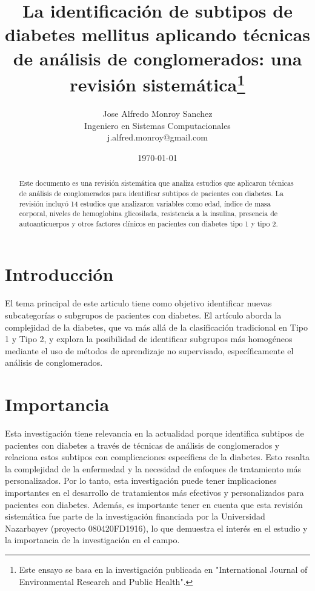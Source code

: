 \documentclass[12pt]{article}
\begin{document}
\title{\textbf{La identificación de subtipos de diabetes mellitus aplicando técnicas de análisis de conglomerados: una revisión sistemática\thanks{Este ensayo se basa en la investigación publicada en "International Journal of Environmental Research and Public Health".}}}
\author{Jose Alfredo Monroy Sanchez\\ Ingeniero en Sistemas Computacionales\\ j.alfred.monroy@gmail.com}
\date{\today}
\maketitle


\begin{abstract}
  Este documento es una revisión sistemática que analiza estudios que aplicaron técnicas de análisis de conglomerados para identificar subtipos de pacientes con diabetes. La revisión incluyó 14 estudios que analizaron variables como edad, índice de masa corporal, niveles de hemoglobina glicosilada, resistencia a la insulina, presencia de autoanticuerpos y otros factores clínicos en pacientes con diabetes tipo 1 y tipo 2.
\end{abstract}

\section{Introducción}
El tema principal de este articulo tiene como objetivo identificar nuevas subcategorías o subgrupos de pacientes con diabetes. El artículo aborda la complejidad de la diabetes, que va más allá de la clasificación tradicional en Tipo 1 y Tipo 2, y explora la posibilidad de identificar subgrupos más homogéneos mediante el uso de métodos de aprendizaje no supervisado, específicamente el análisis de conglomerados.

\section{Importancia}
Esta investigación tiene relevancia en la actualidad porque identifica subtipos de pacientes con diabetes a través de técnicas de análisis de conglomerados y relaciona estos subtipos con complicaciones específicas de la diabetes. Esto resalta la complejidad de la enfermedad y la necesidad de enfoques de tratamiento más personalizados. Por lo tanto, esta investigación puede tener implicaciones importantes en el desarrollo de tratamientos más efectivos y personalizados para pacientes con diabetes. 
Además, es importante tener en cuenta que esta revisión sistemática fue parte de la investigación financiada por la Universidad Nazarbayev (proyecto 080420FD1916), lo que demuestra el interés en el estudio y la importancia de la investigación en el campo.
\end{document}
